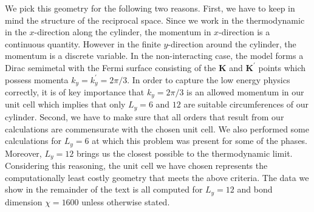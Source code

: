 \documentclass[aps,prx,10pt,twocolumn,floatfix,superscriptaddress,showpacs,numerical,footinbib]{revtex4-1}
\newcommand{\noteAG}[1]{{\color{blue} [AG: #1]}}
\begin{document}
We pick this geometry for the following two reasons.
%
First, 
%
%
we have to keep in mind the structure of the reciprocal space.
%
Since we work in the thermodynamic in the $x$-direction along the cylinder, the momentum in $x$-direction is a continuous quantity.
%
However in the finite $y$-direction around the cylinder, the momentum is a discrete variable.
%
In the non-interacting case, the model forms a Dirac semimetal with the Fermi surface consisting of the 
$\mathbf{K}$ and $\mathbf{K}^{\prime}$ points which possess momenta $k_y=k_y^{\prime} = 2\pi / 3$.
%
%
In order to capture the low energy physics correctly, it is of key importance that $k_y= 2 \pi / 3$ is an allowed momentum in our unit cell which implies that only $L_y=6$ and $12$ are suitable circumferences of our cylinder.
%
Second, we have to make sure that all orders that result from our calculations are commensurate with the chosen unit cell.
%
We also performed some calculations for $L_y=6$ at which this problem was present for some of the phases.
%
Moreover, $L_y=12$ brings us the closest possible to the thermodynamic limit.
%
Considering this reasoning, the unit cell we have chosen represents the computationally least costly geometry that meets the above criteria.
%
The data we show in the remainder of the text is all computed for $L_y = 12$ and bond dimension $\chi = 1600$ unless otherwise stated.
\end{document}

